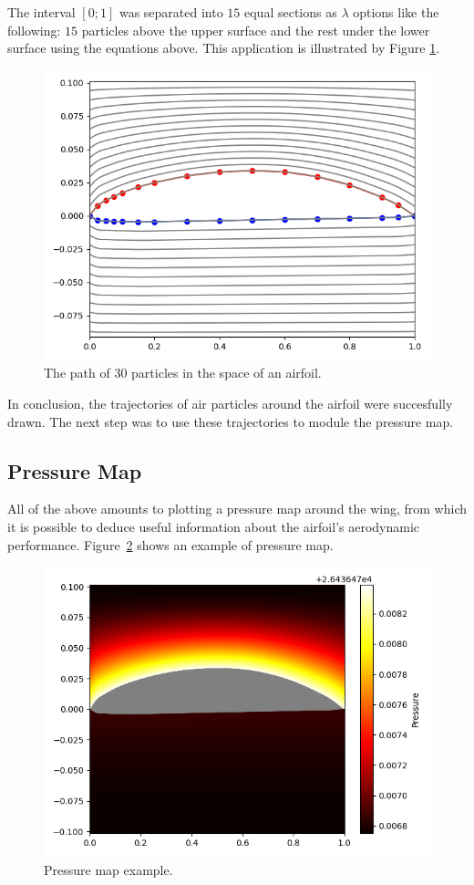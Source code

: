 The interval $[0;1]$ was separated into $15$ equal sections as $\lambda$ options like the following: $15$ particles
 above the upper surface and the rest under the lower surface using the equations above. This 
 application is illustrated by Figure \ref{fig:airflow}.

\begin{figure}[H]
\centering
\includegraphics[width=0.5\linewidth]{res/air_flow.png}
\caption{The path of 30 particles in the space of an airfoil.}
\label{fig:airflow}
\end{figure}

In conclusion, the trajectories of air particles around the airfoil were succesfully drawn. The next step was to use these
trajectories to module the pressure map.

\subsection{Pressure Map }

All of the above amounts to plotting a pressure map around the wing, from which it is possible to deduce useful information about the airfoil's aerodynamic performance. Figure~\ref{fig:pressure_map} shows an example of pressure map.

\begin{figure}[H]
\centering
\includegraphics[width=0.5\linewidth]{res/pressure_map.png}
\caption{Pressure map example.}
\label{fig:pressure_map}
\end{figure}

